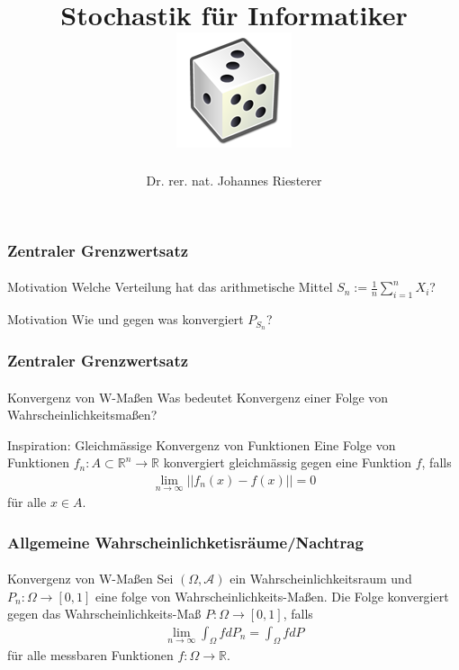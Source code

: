\documentclass{beamer}
\begin{document}
\title[Stochastik] %
{Stochastik für Informatiker
\\
\includegraphics[scale=0.5]{img/craps}
}
\subtitle{}
\author[Dr. Johannes Riesterer] %
{Dr.  rer. nat. Johannes Riesterer}

\date[KPT 2004] %
{}

\subject{Stochastik}


\begin{frame}
    \frametitle{Zentraler Grenzwertsatz}
\framesubtitle{}

\begin{block}{Motivation}
Welche Verteilung hat das arithmetische Mittel $S_n:= \frac{1}{n} \sum_{i=1}^n X_i$?
\end{block}
\begin{block}{Motivation}
Wie und gegen was konvergiert $P_{S_n}$? 
\end{block}

 \end{frame}




\begin{frame}
    \frametitle{Zentraler Grenzwertsatz}
\framesubtitle{}

\begin{block}{Konvergenz von W-Maßen}
Was bedeutet Konvergenz einer Folge von Wahrscheinlichkeitsmaßen?
\end{block}
\begin{block}{Inspiration: Gleichmässige Konvergenz von Funktionen}
Eine Folge von Funktionen $f_n: A \subset \mathbb{R}^n \to \mathbb{R}$ konvergiert gleichmässig gegen eine Funktion $f$, falls 
\begin{align*}
\lim_{n \to \infty} ||f_n(x) -f(x) || = 0
\end{align*}
für alle $x \in A$.
\end{block}

 \end{frame}

\begin{frame}
    \frametitle{Allgemeine Wahrscheinlichketisräume/Nachtrag}
\framesubtitle{}

\begin{block}{Konvergenz von W-Maßen}
Sei $(\Omega, \mathcal{A})$ ein Wahrscheinlichkeitsraum und $P_n : \Omega \to [0,1]$ eine folge von Wahrscheinlichkeits-Maßen. Die Folge konvergiert gegen
das Wahrscheinlichkeits-Maß $P: \Omega \to [0,1]$, falls 
\begin{align*}
\lim_{n \to \infty} \int_\Omega f dP_n = \int_\Omega f dP
\end{align*}
für alle messbaren Funktionen $f: \Omega \to \mathbb{R}$.
\end{block}
 \end{frame}
\end{document}
